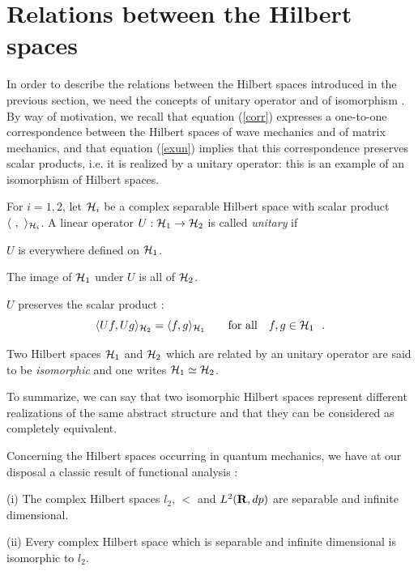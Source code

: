 \documentclass[a4wide,12pt]{report}
\begin{document}
 
 
\section{Relations between the Hilbert spaces}
 
 In order to describe the relations between the Hilbert spaces
 introduced in the previous section, we need 
 the concepts of unitary operator and of isomorphism \cite{rs}.
By way of motivation, we recall 
that equation (\ref{corr}) expresses a one-to-one correspondence 
between the Hilbert spaces of wave mechanics and of matrix mechanics, 
and that equation (\ref{exun}) implies that 
this correspondence preserves scalar products,
i.e. it is realized by a unitary operator:
this is an example of an 
isomorphism of Hilbert spaces.

\begin{defin}
For $i=1,2$, let ${\cal H}_i$  be a complex separable Hilbert space with
scalar product  $\langle \ , \ \rangle _{{\cal H}_i}$. 
A linear operator
$U : {\cal H}_1 \to {\cal H}_2$ is called  {\em unitary}
if
 
 $U$ is everywhere defined on ${\cal H}_1$.
 
 The image of ${\cal H}_1$ under $U$ is all of 
${\cal H}_2$.
 
 $U$ preserves the scalar product :
\begin{equation}
\label{un}
\langle U f , U g \rangle _{{\cal H}_2} = \langle f , g \rangle _{{\cal H}_1}
\qquad \mbox{for  all} \quad f,g \in {\cal H}_1
\ \ .
\end{equation}
 
Two Hilbert spaces ${\cal H}_1$ and  ${\cal H}_2$ which are related by 
 an unitary operator are said to be {\em isomorphic} and one writes 
${\cal H}_1 \simeq {\cal H}_2$.
\end{defin}
	
To summarize, we can say that two isomorphic Hilbert spaces 
represent different realizations of the same abstract 
structure and that they can be considered as completely equivalent. 

Concerning the Hilbert spaces occurring in quantum mechanics,
we have at our disposal a  classic result of functional analysis : 

\begin{theo}
{\rm (i)} The complex Hilbert spaces $l_2, \,  \lt$ and  ${L^2 ({{\bf R}},dp)}$
are separable and infinite dimensional. 
 
\noindent
{\rm (ii)} Every complex Hilbert space which is separable and infinite
dimensional is isomorphic to $l_2$.
\end{theo}
\end{document}
